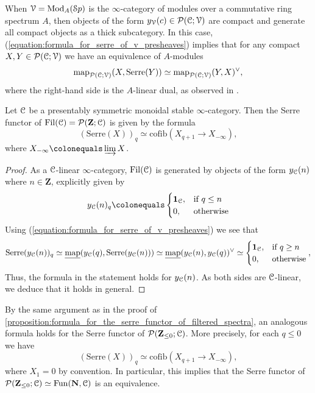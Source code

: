 \documentclass[oneside,a4paper]{amsart}
\begin{document}
\begin{remark}
When $\EuScript{V} = \mathrm{Mod}_{A}(\EuScript{S}p)$ is the $\infty$-category of modules over a commutative ring spectrum $A$, then objects of the form $y_{\EuScript{V}}(c) \in \mathcal{P}(\EuScript{C}; \EuScript{V})$ are compact and generate all compact objects as a thick subcategory. In this case, (\ref{equation:formula_for_serre_of_v_presheaves}) implies that for any compact $X, Y \in \mathcal{P}(\EuScript{C}; \EuScript{V})$ we have an equivalence of $A$-modules 
\[
\textnormal{map}_{\mathcal{P}(\EuScript{C}; \EuScript{V})}(X, \mathrm{Serre}(Y)) \simeq \textnormal{map}_{\mathcal{P}(\EuScript{C}; \EuScript{V})}(Y, X)^{\vee},
\]
where the right-hand side is the $A$-linear dual, as observed in \cite[{Remark 11.1.5.2}]{SAG}. 
\end{remark}

\begin{proposition}
\label{proposition:formula_for_the_serre_functor_of_filtered_spectra}
Let $\EuScript{C}$ be a presentably symmetric monoidal stable $\infty$-category. Then the Serre functor of $\operatorname{Fil}(\EuScript{C}) = \mathcal{P}(\mathbf{Z}; \EuScript{C})$ is given by the formula 
\[
(\mathrm{Serre}(X))_{q} \simeq \mathrm{cofib}(X_{q+1} \rightarrow X_{-\infty}), 
\]
where $X_{-\infty} \colonequals \varinjlim X$. 
\end{proposition}

\begin{proof}
As a $\EuScript{C}$-linear $\infty$-category, $\operatorname{Fil}(\EuScript{C})$ is generated by objects of the form $y_{\EuScript{C}}(n)$ where $n \in \mathbf{Z}$, explicitly given by 
\[
y_{\ccat}(n)_{q} \colonequals
    \begin{cases}
      \mathbf{1}_{\ccat}, & \text{if } q \leq n \\
      0, & \text{otherwise}
    \end{cases}
    \]
Using (\ref{equation:formula_for_serre_of_v_presheaves}) we see that 
\[
\mathrm{Serre}(y_{\EuScript{C}}(n))_{q} \simeq \underline{\textnormal{map}}(y_{\EuScript{C}}(q), \mathrm{Serre}(y_{\EuScript{C}}(n))) \simeq \underline{\textnormal{map}}(y_{\EuScript{C}}(n), y_{\EuScript{C}}(q))^{\vee} \simeq \begin{cases}
      {\mathbf{1}_{\EuScript{C}}}, & \text{if } q \geq n \\
      0, & \text{otherwise}
    \end{cases}, 
\]
Thus, the formula in the statement holds for $y_{\EuScript{C}}(n)$. As both sides are $\EuScript{C}$-linear, we deduce that it holds in general. 
\end{proof} 

\begin{remark}
\label{remark:serre_functor_of_non_positively_filtered_objects}
By the same argument as in the proof of \cref{proposition:formula_for_the_serre_functor_of_filtered_spectra}, an analogous formula holds for the Serre functor of $\mathcal{P}(\mathbf{Z}_{\leq 0}; \EuScript{C})$. More precisely, for each $q \leq 0$ we have 
\[
(\mathrm{Serre}(X))_{q} \simeq \mathrm{cofib}(X_{q+1} \rightarrow X_{-\infty}),
\]
where $X_{1}=0$ by convention. In particular, this implies that the Serre functor of $\mathcal{P}(\mathbf{Z}_{\leq 0}; \EuScript{C}) \simeq \mathrm{Fun}(\mathbf{N}, \EuScript{C})$ is an equivalence. 
\end{remark}
\end{document}
